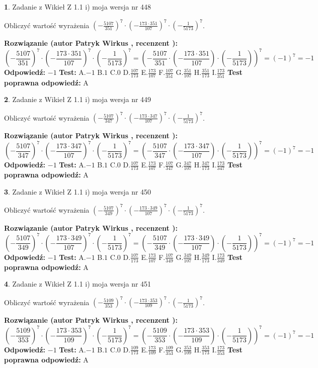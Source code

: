 \documentclass[12pt, a4paper]{article}
\theoremstyle{definition} %
\newtheorem{zad}{}
\newcommand{\zadStart}[1]{\begin{zad}#1\newline}
\newcommand{\zadStop}{\end{zad}}
\newcommand{\rozwStart}[2]{\noindent \textbf{Rozwiązanie (autor #1 , recenzent #2): }\newline}
\newcommand{\rozwStop}{\newline}
\newcommand{\odpStart}{\noindent \textbf{Odpowiedź:}\newline}
\newcommand{\odpStop}{\newline}
\newcommand{\testStart}{\noindent \textbf{Test:}\newline}
\newcommand{\testStop}{\newline}
\newcommand{\kluczStart}{\noindent \textbf{Test poprawna odpowiedź:}\newline}
\newcommand{\kluczStop}{\newline}
\begin{document}
\zadStart{Zadanie z Wikieł Z 1.1 i) moja wersja nr 448}

Obliczyć wartość wyrażenia $(-\frac{5107}{351})^{7} \cdot (-\frac{173 \cdot 351}{107})^{7} \cdot (-\frac{1}{5173})^{7}$.
\zadStop
\rozwStart{Patryk Wirkus}{}
$$(-\frac{5107}{351})^{7} \cdot (-\frac{173 \cdot 351}{107})^{7} \cdot (-\frac{1}{5173})^{7} = (-\frac{5107}{351} \cdot (-\frac{173 \cdot 351}{107}) \cdot (-\frac{1}{5173}))^{7} = (-1)^{7} = -1$$
\rozwStop
\odpStart
$-1$
\odpStop
\testStart
A.$-1$ B.$1$ C.$0$ D.$\frac{107}{173}$ E.$\frac{173}{107}$
F.$\frac{107}{351}$ G.$\frac{351}{107}$
H.$\frac{351}{173}$
I.$\frac{173}{351}$
\testStop
\kluczStart
A
\kluczStop



\zadStart{Zadanie z Wikieł Z 1.1 i) moja wersja nr 449}

Obliczyć wartość wyrażenia $(-\frac{5107}{347})^{7} \cdot (-\frac{173 \cdot 347}{107})^{7} \cdot (-\frac{1}{5173})^{7}$.
\zadStop
\rozwStart{Patryk Wirkus}{}
$$(-\frac{5107}{347})^{7} \cdot (-\frac{173 \cdot 347}{107})^{7} \cdot (-\frac{1}{5173})^{7} = (-\frac{5107}{347} \cdot (-\frac{173 \cdot 347}{107}) \cdot (-\frac{1}{5173}))^{7} = (-1)^{7} = -1$$
\rozwStop
\odpStart
$-1$
\odpStop
\testStart
A.$-1$ B.$1$ C.$0$ D.$\frac{107}{173}$ E.$\frac{173}{107}$
F.$\frac{107}{347}$ G.$\frac{347}{107}$
H.$\frac{347}{173}$
I.$\frac{173}{347}$
\testStop
\kluczStart
A
\kluczStop



\zadStart{Zadanie z Wikieł Z 1.1 i) moja wersja nr 450}

Obliczyć wartość wyrażenia $(-\frac{5107}{349})^{7} \cdot (-\frac{173 \cdot 349}{107})^{7} \cdot (-\frac{1}{5173})^{7}$.
\zadStop
\rozwStart{Patryk Wirkus}{}
$$(-\frac{5107}{349})^{7} \cdot (-\frac{173 \cdot 349}{107})^{7} \cdot (-\frac{1}{5173})^{7} = (-\frac{5107}{349} \cdot (-\frac{173 \cdot 349}{107}) \cdot (-\frac{1}{5173}))^{7} = (-1)^{7} = -1$$
\rozwStop
\odpStart
$-1$
\odpStop
\testStart
A.$-1$ B.$1$ C.$0$ D.$\frac{107}{173}$ E.$\frac{173}{107}$
F.$\frac{107}{349}$ G.$\frac{349}{107}$
H.$\frac{349}{173}$
I.$\frac{173}{349}$
\testStop
\kluczStart
A
\kluczStop



\zadStart{Zadanie z Wikieł Z 1.1 i) moja wersja nr 451}

Obliczyć wartość wyrażenia $(-\frac{5109}{353})^{7} \cdot (-\frac{173 \cdot 353}{109})^{7} \cdot (-\frac{1}{5173})^{7}$.
\zadStop
\rozwStart{Patryk Wirkus}{}
$$(-\frac{5109}{353})^{7} \cdot (-\frac{173 \cdot 353}{109})^{7} \cdot (-\frac{1}{5173})^{7} = (-\frac{5109}{353} \cdot (-\frac{173 \cdot 353}{109}) \cdot (-\frac{1}{5173}))^{7} = (-1)^{7} = -1$$
\rozwStop
\odpStart
$-1$
\odpStop
\testStart
A.$-1$ B.$1$ C.$0$ D.$\frac{109}{173}$ E.$\frac{173}{109}$
F.$\frac{109}{353}$ G.$\frac{353}{109}$
H.$\frac{353}{173}$
I.$\frac{173}{353}$
\testStop
\kluczStart
A
\kluczStop
\end{document}
